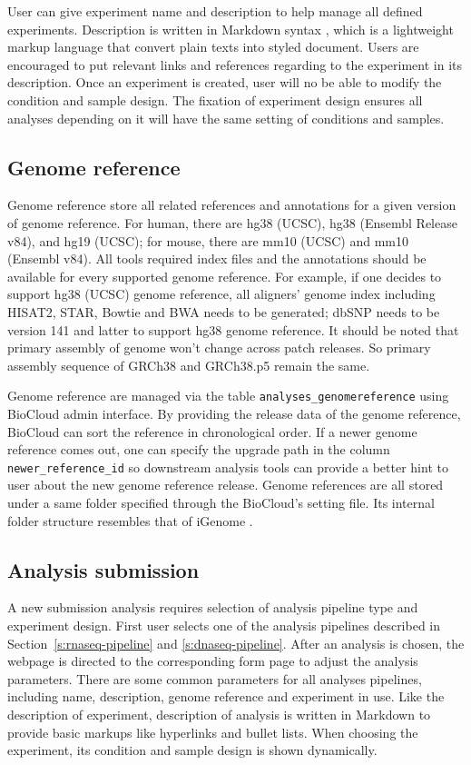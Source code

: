 User can give experiment name and description to help manage all defined
experiments. Description is written in Markdown syntax \cite{:commonmark},
which is a lightweight markup language that convert plain texts into styled
document. Users are encouraged to put relevant links and references regarding
to the experiment in its description. Once an experiment is created, user will
no be able to modify the condition and sample design. The fixation of
experiment design ensures all analyses depending on it will have the same
setting of conditions and samples.


\subsection{Genome reference}

Genome reference store all related references and annotations for a given
version of genome reference. For human, there are hg38 (UCSC), hg38 (Ensembl
Release v84), and hg19 (UCSC); for mouse, there are mm10 (UCSC) and mm10
(Ensembl v84). All tools required index files and the annotations should be
available for every supported genome reference. For example, if one decides to
support hg38 (UCSC) genome reference, all aligners' genome index including
HISAT2, STAR, Bowtie and BWA needs to be generated; dbSNP needs to be version
141 and latter to support hg38 genome reference. It should be noted that
primary assembly of genome won't change across patch releases. So primary
assembly sequence of GRCh38 and GRCh38.p5 remain the same.

Genome reference are managed via the table
\texttt{analyses\_genomereference} using BioCloud admin interface. By providing
the release data of the genome reference, BioCloud can sort the reference in
chronological order. If a newer genome reference comes out, one can specify the
upgrade path in the column \texttt{newer\_reference\_id} so downstream analysis
tools can provide a better hint to user about the new genome reference release.
Genome references are all stored under a same folder specified through the
BioCloud's setting file. Its internal folder structure resembles that of
iGenome \cite{:igenomes}.


\subsection{Analysis submission}

A new submission analysis requires selection of analysis pipeline type and
experiment design. First user selects one of the analysis pipelines described
in Section~\ref{s:rnaseq-pipeline} and \ref{s:dnaseq-pipeline}. After an
analysis is chosen, the webpage is directed to the corresponding form page to
adjust the analysis parameters. There are some common parameters for all
analyses pipelines, including name, description, genome reference and
experiment in use. Like the description of experiment, description of analysis
is written in Markdown to provide basic markups like hyperlinks and bullet
lists. When choosing the experiment, its condition and sample design is shown
dynamically.

